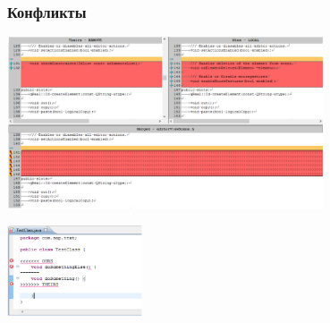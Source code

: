 \documentclass{../slides-style}
\begin{document}
    \begin{frame}
        \frametitle{Конфликты}
        \begin{center}
            \includegraphics[width=0.7\textwidth]{conflicts.png}
        \end{center}
        \begin{center}
            \includegraphics[width=0.3\textwidth]{conflictsInCode.png}
        \end{center}
    \end{frame}
\end{document}
